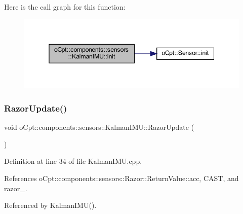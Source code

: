 Here is the call graph for this function\+:
\nopagebreak
\begin{figure}[H]
\begin{center}
\leavevmode
\includegraphics[width=345pt]{classo_cpt_1_1components_1_1sensors_1_1_kalman_i_m_u_a0d2dfbc9cc468e32f9c58f0a8c92c3ca_cgraph}
\end{center}
\end{figure}
\hypertarget{classo_cpt_1_1components_1_1sensors_1_1_kalman_i_m_u_a99b62a459b69b3b877d98dcb34b286d7}{}\label{classo_cpt_1_1components_1_1sensors_1_1_kalman_i_m_u_a99b62a459b69b3b877d98dcb34b286d7} 
\subsubsection{\texorpdfstring{Razor\+Update()}{RazorUpdate()}}
{\footnotesize\ttfamily void o\+Cpt\+::components\+::sensors\+::\+Kalman\+I\+M\+U\+::\+Razor\+Update (\begin{DoxyParamCaption}{ }\end{DoxyParamCaption})\hspace{0.3cm}{\ttfamily [private]}}



Definition at line 34 of file Kalman\+I\+M\+U.\+cpp.



References o\+Cpt\+::components\+::sensors\+::\+Razor\+::\+Return\+Value\+::acc, C\+A\+ST, and razor\+\_\+.



Referenced by Kalman\+I\+M\+U().

